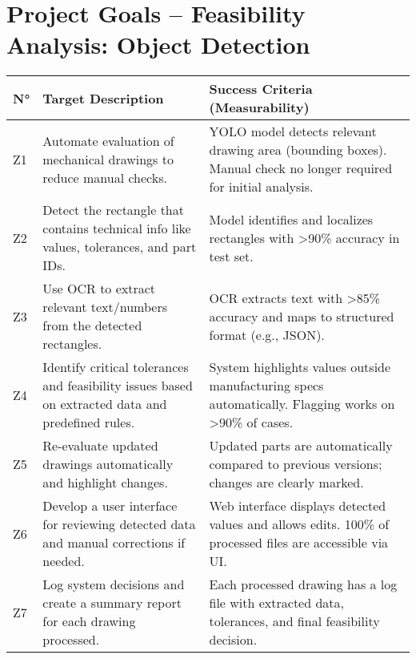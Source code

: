\documentclass{article}
\begin{document}
\section*{Project Goals – Feasibility Analysis: Object Detection}

\begin{longtable}{|>{\centering\arraybackslash}p{0.8cm}|p{7cm}|p{7cm}|}
\hline
\textbf{N°} & \textbf{Target Description} & \textbf{Success Criteria (Measurability)} \\
\hline
Z1 & Automate evaluation of mechanical drawings to reduce manual checks. & YOLO model detects relevant drawing area (bounding boxes). Manual check no longer required for initial analysis. \\
\hline
Z2 & Detect the rectangle that contains technical info like values, tolerances, and part IDs. & Model identifies and localizes rectangles with >90\% accuracy in test set. \\
\hline
Z3 & Use OCR to extract relevant text/numbers from the detected rectangles. & OCR extracts text with >85\% accuracy and maps to structured format (e.g., JSON). \\
\hline
Z4 & Identify critical tolerances and feasibility issues based on extracted data and predefined rules. & System highlights values outside manufacturing specs automatically. Flagging works on >90\% of cases. \\
\hline
Z5 & Re-evaluate updated drawings automatically and highlight changes. & Updated parts are automatically compared to previous versions; changes are clearly marked. \\
\hline
Z6 & Develop a user interface for reviewing detected data and manual corrections if needed. & Web interface displays detected values and allows edits. 100\% of processed files are accessible via UI. \\
\hline
Z7 & Log system decisions and create a summary report for each drawing processed. & Each processed drawing has a log file with extracted data, tolerances, and final feasibility decision. \\
\hline
\end{longtable}
\end{document}
